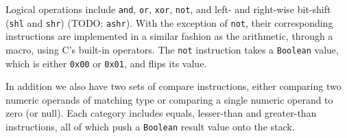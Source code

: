 Logical operations include {\tt and}, {\tt or}, {\tt xor}, {\tt not}, and left-
and right-wise bit-shift ({\tt shl} and {\tt shr}) (TODO: {\tt ashr}). With the
exception of {\tt not}, their corresponding instructions are implemented in a
similar fashion as the arithmetic, through a macro, using C's built-in
operators. The {\tt not} instruction takes a {\tt Boolean} value, which is
either {\tt 0x00} or {\tt 0x01}, and flips its value.

In addition we also have two sets of compare instructions, either comparing two
numeric operands of matching type or comparing a single numeric operand to zero
(or null). Each category includes equals, lesser-than and greater-than
instructions, all of which push a {\tt Boolean} result value onto the stack.

